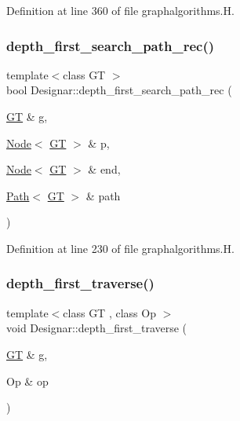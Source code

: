 Definition at line 360 of file graphalgorithms.\+H.

\mbox{\label{namespace_designar_a0a2a9a44cfea24efc22cab8b8a9d2acd}} 
\subsubsection{\texorpdfstring{depth\+\_\+first\+\_\+search\+\_\+path\+\_\+rec()}{depth\_first\_search\_path\_rec()}}
{\footnotesize\ttfamily template$<$class GT $>$ \\
bool Designar\+::depth\+\_\+first\+\_\+search\+\_\+path\+\_\+rec (\begin{DoxyParamCaption}\item[{\hyperlink{demo-buildgraph_8_c_a3001c40d2c31ca87ed96cd7d1334a55e}{GT} \&}]{g,  }\item[{\hyperlink{namespace_designar_a5af326c65aa2bd26b26c410f2030d09e}{Node}$<$ \hyperlink{demo-buildgraph_8_c_a3001c40d2c31ca87ed96cd7d1334a55e}{GT} $>$ \&}]{p,  }\item[{\hyperlink{namespace_designar_a5af326c65aa2bd26b26c410f2030d09e}{Node}$<$ \hyperlink{demo-buildgraph_8_c_a3001c40d2c31ca87ed96cd7d1334a55e}{GT} $>$ \&}]{end,  }\item[{\hyperlink{class_designar_1_1_path}{Path}$<$ \hyperlink{demo-buildgraph_8_c_a3001c40d2c31ca87ed96cd7d1334a55e}{GT} $>$ \&}]{path }\end{DoxyParamCaption})}



Definition at line 230 of file graphalgorithms.\+H.

\mbox{\label{namespace_designar_a259944a482130c7a304058ed801872a9}} 
\subsubsection{\texorpdfstring{depth\+\_\+first\+\_\+traverse()}{depth\_first\_traverse()}\hspace{0.1cm}{\footnotesize\ttfamily [1/2]}}
{\footnotesize\ttfamily template$<$class GT , class Op $>$ \\
void Designar\+::depth\+\_\+first\+\_\+traverse (\begin{DoxyParamCaption}\item[{\hyperlink{demo-buildgraph_8_c_a3001c40d2c31ca87ed96cd7d1334a55e}{GT} \&}]{g,  }\item[{Op \&}]{op }\end{DoxyParamCaption})}



